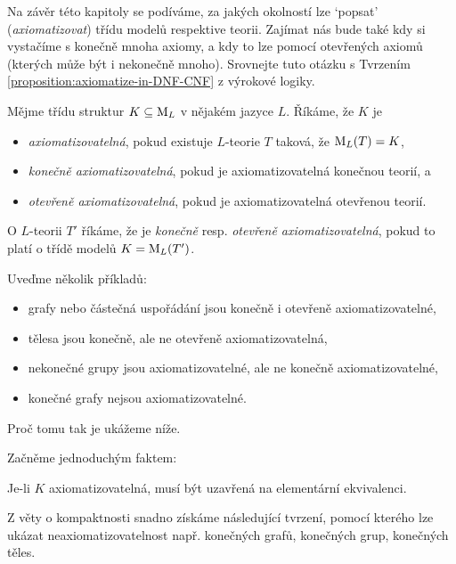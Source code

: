 Na závěr této kapitoly se podíváme, za jakých okolností lze `popsat' (\emph{axiomatizovat}) třídu modelů respektive teorii. Zajímat nás bude také kdy si vystačíme s konečně mnoha axiomy, a kdy to lze pomocí otevřených axiomů (kterých může být i nekonečně mnoho). Srovnejte tuto otázku s Tvrzením \ref{proposition:axiomatize-in-DNF-CNF} z výrokové logiky. 

\begin{definition}[Axiomatizovatelnost]
Mějme třídu struktur $K\subseteq\operatorname{M}_L$ v nějakém jazyce $L$. Říkáme, že $K$ je
\begin{itemize}
    \item \emph{axiomatizovatelná}, pokud existuje $L$-teorie $T$ taková, že $\operatorname{M}_L(T)=K$,
    \item \emph{konečně axiomatizovatelná}, pokud je axiomatizovatelná konečnou teorií, a
    \item \emph{otevřeně axiomatizovatelná}, pokud je axiomatizovatelná otevřenou teorií.
\end{itemize}
O $L$-teorii $T'$ říkáme, že je \emph{konečně} resp. \emph{otevřeně axiomatizovatelná}, pokud to platí o třídě modelů $K=\operatorname{M}_L(T')$.
\end{definition}

\begin{example}
    Uveďme několik příkladů:
    \begin{itemize}
        \item grafy nebo částečná uspořádání jsou konečně i otevřeně axiomatizovatelné,
        \item tělesa jsou konečně, ale ne otevřeně axiomatizovatelná,
        \item nekonečné grupy jsou axiomatizovatelné, ale ne konečně axiomatizovatelné,
        \item konečné grafy nejsou axiomatizovatelné.
    \end{itemize}
    Proč tomu tak je ukážeme níže.
\end{example}

Začněme jednoduchým faktem:

\begin{observation}
    Je-li $K$ axiomatizovatelná, musí být uzavřená na elementární ekvivalenci.  
\end{observation}

Z věty o kompaktnosti snadno získáme následující tvrzení, pomocí kterého lze ukázat neaxiomatizovatelnost např. konečných grafů, konečných grup, konečných těles.

